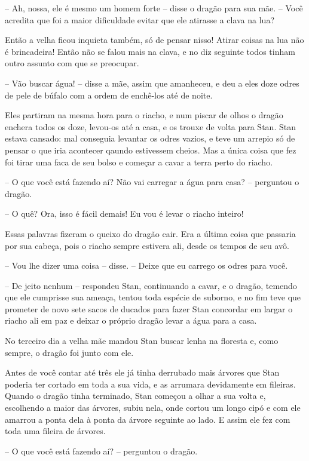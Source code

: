 -- Ah, nossa, ele é mesmo um homem forte -- disse o dragão para sua mãe.
-- Você acredita que foi a maior dificuldade evitar que ele atirasse a
clava na lua? 

Então a velha ficou inquieta também, só de pensar nisso! Atirar coisas
na lua não é brincadeira! Então não se falou mais na clava, e no diz
seguinte todos tinham outro assunto com que se preocupar.

-- Vão buscar água! -- disse a mãe, assim que amanheceu, e deu a eles
doze odres de pele de búfalo com a ordem de enchê-los até de noite.

Eles partiram na mesma hora para o riacho, e num piscar de olhos o
dragão enchera todos os doze, levou-os até a casa, e os trouxe de
volta para Stan. Stan estava cansado: mal conseguia levantar os odres
vazios, e teve um arrepio só de pensar o que iria acontecer qaundo
estivessem cheios. Mas a única coisa que fez foi tirar uma faca de
seu bolso e começar a cavar a terra perto do riacho.

-- O que você está fazendo aí? Não vai carregar a água para casa? --
perguntou o dragão.

-- O quê? Ora, isso é fácil demais! Eu vou é levar o riacho inteiro!

Essas palavras fizeram o queixo do dragão cair. Era a última coisa que
passaria por sua cabeça, pois o riacho sempre estivera ali, desde os
tempos de seu avô.

-- Vou lhe dizer uma coisa -- disse. -- Deixe que eu carrego os odres
para você.

-- De jeito nenhum -- respondeu Stan, continuando a cavar, e o dragão,
temendo que ele cumprisse sua ameaça, tentou toda espécie de suborno,
e no fim teve que prometer de novo sete sacos de ducados para fazer
Stan concordar em largar o riacho ali em paz e deixar o próprio
dragão levar a água para a casa.

No terceiro dia a velha mãe mandou Stan buscar lenha na floresta e,
como sempre, o dragão foi junto com ele.

Antes de você contar até três ele já tinha derrubado mais árvores que
Stan poderia ter cortado em toda a sua vida, e as arrumara
devidamente em fileiras. Quando o dragão tinha terminado, Stan
começou a olhar a sua volta e, escolhendo a maior das árvores, subiu
nela, onde cortou um longo cipó e com ele amarrou a ponta dela à
ponta da árvore seguinte ao lado. E assim ele fez com toda uma
fileira de árvores.

-- O que você está fazendo aí? -- perguntou o dragão.

